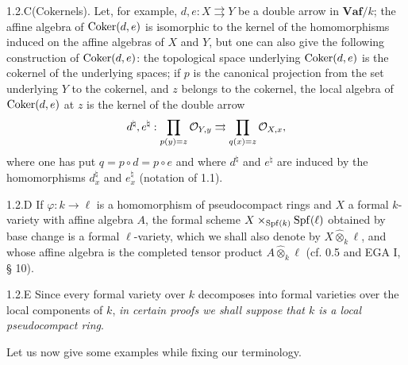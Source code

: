 \begin{example}{1.2.C}\label{VIIB.1.2.C}(Cokernels).
Let, for example, $d,e:X\rightrightarrows Y$ be a double arrow in $\mathbf{Vaf}/k$; the affine algebra of $\operatorname{Coker}(d,e)$ is isomorphic to the kernel of the homomorphisms induced on the affine algebras of $X$ and $Y$, but one can also give the following construction of $\operatorname{Coker}(d,e)$: the topological space underlying $\operatorname{Coker}(d,e)$ is the cokernel of the underlying spaces; if $p$ is the canonical projection from the set underlying $Y$ to the cokernel, and $z$ belongs to the cokernel, the local algebra of $\operatorname{Coker}(d,e)$ at $z$ is the kernel of the double arrow
\[
d^\natural,e^\natural:\prod_{p(y)=z}\mathcal{O}_{Y,y}\rightrightarrows\prod_{q(x)=z}\mathcal{O}_{X,x},
\]
where one has put $q=p\circ d=p\circ e$ and where $d^\natural$ and $e^\natural$ are induced by the homomorphisms $d_x^\natural$ and $e_x^\natural$ (notation of 1.1).
\end{example}
\begin{definition}{1.2.D}\label{VIIB.1.2.D}
If $\varphi:k\to\ell$ is a homomorphism of pseudocompact rings and $X$ a formal $k$-variety with affine algebra $A$, the formal scheme $X\times_{\operatorname{Spf}(k)}\operatorname{Spf}(\ell)$ obtained by base change is a formal $\ell$-variety, which we shall also denote by $X\widehat\otimes_k\ell$, and whose affine algebra is the completed tensor product $A\widehat\otimes_k\ell$ (cf. 0.5 and EGA I, § 10).
\end{definition}
\begin{remark}{1.2.E}\label{VIIB.1.2.E}
Since every formal variety over $k$ decomposes into formal varieties over the local components of $k$, \emph{in certain proofs we shall suppose that $k$ is a local pseudocompact ring}.
\end{remark}
Let us now give some examples while fixing our terminology.

